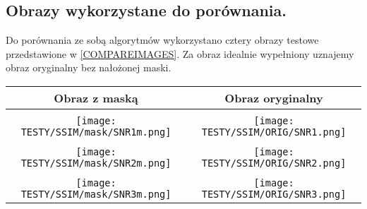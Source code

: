 \documentclass[12pt, twoside, openany]{report}
\theoremstyle{definition}
\begin{document}
\subsection{Obrazy wykorzystane do porównania.}
Do porównania ze sobą algorytmów wykorzystano cztery obrazy testowe przedstawione w \autoref{COMPAREIMAGES}. Za obraz idealnie wypełniony uznajemy obraz oryginalny bez nałożonej maski.
\begin{longtable}[h!]{|c|c|}
    \hline
    Obraz z maską & Obraz oryginalny \\ \hline

    \multicolumn{2}{|c|}{
		\SNRI
    } \\ \hline 
    \begin{minipage}{0.5\textwidth}
    \vspace{0.5cm}
    \centering
    \texttt{[image: TESTY/SSIM/mask/SNR1m.png]}
    \vspace{0.5cm}
    \end{minipage}
	&
    \begin{minipage}{0.5\textwidth}
    \vspace{0.5cm}
    \centering
    \texttt{[image: TESTY/SSIM/ORIG/SNR1.png]}
    \vspace{0.5cm}
    \end{minipage}\\ \hline

    \multicolumn{2}{|c|}{
		\SNRII
    } \\ \hline 
    \begin{minipage}{0.5\textwidth}
    \vspace{0.5cm}
    \centering
    \texttt{[image: TESTY/SSIM/mask/SNR2m.png]}
    \vspace{0.5cm}
    \end{minipage}
	&
    \begin{minipage}{0.5\textwidth}
    \vspace{0.5cm}
    \centering
    \texttt{[image: TESTY/SSIM/ORIG/SNR2.png]}
    \vspace{0.5cm}
    \end{minipage}\\ \hline

    \multicolumn{2}{|c|}{
		\SNRIII
    } \\ \hline 
    \begin{minipage}{0.5\textwidth}
    \vspace{0.5cm}
    \centering
    \texttt{[image: TESTY/SSIM/mask/SNR3m.png]}
    \vspace{0.5cm}
    \end{minipage}
	&
    \begin{minipage}{0.5\textwidth}
    \vspace{0.5cm}
    \centering
    \texttt{[image: TESTY/SSIM/ORIG/SNR3.png]}
    \vspace{0.5cm}
    \end{minipage}\\ \hline


\end{longtable}
\end{document}
